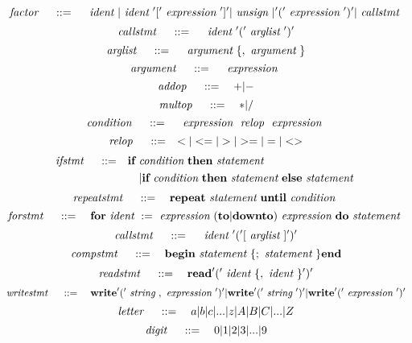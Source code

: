 \[
	~\emph{factor}~ \quad ::= \quad
		~\emph{ident}~ | ~\emph{ident}~ '[' ~\emph{expression}~ ']' | ~\emph{unsign}~ |
			'(' ~\emph{expression}~ ')' | ~\emph{callstmt}~
\]
\[
	~\emph{callstmt}~ \quad ::= \quad
		~\emph{ident}~ '(' ~\emph{arglist}~ ')'
\]
\[
	~\emph{arglist}~ \quad ::= \quad
		~\emph{argument}~ \{, ~\emph{argument}~ \}
\]
\[
	~\emph{argument}~ \quad ::= \quad
		~\emph{expression}~
\]
\[
	~\emph{addop}~ \quad ::= \quad
		+|-
\]
\[
	~\emph{multop}~ \quad ::= \quad
		*|/
\]
\[
	~\emph{condition}~ \quad ::= \quad
		~\emph{expression}~ ~\emph{relop}~ ~\emph{expression}~
\]
\[
	~\emph{relop}~ \quad ::= \quad
		< | <= | > | >=| = |  <>
\]
\[
\begin{aligned}
	~\emph{ifstmt}~ \quad ::= \quad
		& \textbf{if} ~\emph{condition}~ \textbf{then} ~\emph{statement}~ \\
		& \quad | \textbf{if} ~\emph{condition}~ \textbf{then} ~\emph{statement}~ \textbf{else} ~\emph{statement}~
\end{aligned}
\]
\[
	~\emph{repeatstmt}~ \quad ::= \quad
		\textbf{repeat} ~\emph{statement}~ \textbf{until} ~\emph{condition}~
\]
\[
	~\emph{forstmt}~ \quad ::= \quad
		\textbf{for} ~\emph{ident}~ := ~\emph{expression}~ ( \textbf{to} | \textbf{downto})
			~\emph{expression}~ \textbf{do} ~\emph{statement}~
\]
\[
	~\emph{callstmt}~ \quad ::= \quad
		~\emph{ident}~ '(' [ ~\emph{arglist}~] ')'
\]
\[
	~\emph{compstmt}~ \quad ::= \quad
		\textbf{begin} ~\emph{statement}~ \{; ~\emph{statement}~ \} \textbf{end}
\]
\[
	~\emph{readstmt}~ \quad ::= \quad
		\textbf{read} '(' ~\emph{ident}~ \{, ~\emph{ident}~ \} ')'
\]
\[
	~\emph{writestmt}~ \quad ::= \quad
		\textbf{write} '(' ~\emph{string}~ , ~\emph{expression}~ ')' |
			\textbf{write} '(' ~\emph{string}~ ')' |
				\textbf{write} '(' ~\emph{expression}~')'
\]
\[
	~\emph{letter}~ \quad ::= \quad
		a|b|c|...|z|A|B|C|...|Z
\]
\[
	~\emph{digit}~ \quad ::= \quad
		0|1|2|3|...|9
\]
